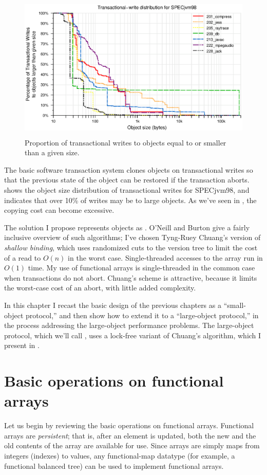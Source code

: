 \begin{figure}
\begin{center}
\includegraphics[height=2.75in,clip=true]{Figures/tr-w-all-1}%
\end{center}%
\caption{Proportion of transactional writes to objects equal to or
  smaller than a given size.}
\label{fig:tr-w}%
\end{figure}%
The basic \apex software transaction system clones objects on
transactional writes so that the previous state of the object can be
restored if the transaction aborts.   shows the object
size distribution of transactional writes for SPECjvm98, and
indicates that over 10\% of writes may be to large objects.
As we've seen in , the copying cost can become
excessive.

The solution I propose
represents objects as .  O'Neill and Burton \cite{ONeillBu97} give a fairly
inclusive overview of such algorithms; I've chosen Tyng-Ruey Chuang's
version \cite{Chuang94} of \emph{shallow binding}, which uses
randomized cuts to the version tree to limit the cost of a read to
$O(n)$ in the worst case.  Single-threaded accesses to the array run in
$O(1)$ time.  My use of functional arrays is single-threaded in the common
case when transactions do not abort.  Chuang's scheme is attractive,
because it limits the worst-case cost of an abort, with little
added complexity.

In this chapter I recast the basic \apex design of the previous
chapters as a
``small-object protocol,'' and then show how to extend it to a ``large-object protocol,'' in the process addressing the large-object performance
problems.  The large-object protocol, which we'll call \lapex, uses a
lock-free variant of 
Chuang's algorithm, which I present in .

\section{Basic operations on functional arrays}\label{sec:naivefun}
Let us begin by reviewing the basic operations on functional arrays.
Functional arrays are \emph{persistent}; that is,
after an element is updated, both the new and the old contents of the
array are available for use.  Since arrays are simply maps from
integers (indexes) to values, any functional-map datatype (for
example, a functional balanced tree) can be used to implement
functional arrays.

